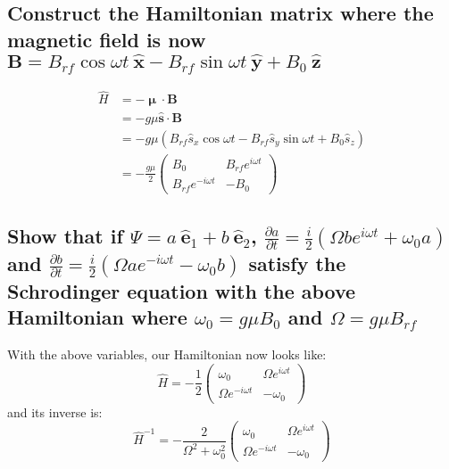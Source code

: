 \documentclass[a4paper]{scrartcl}
\begin{document}
\subsection{Construct the Hamiltonian matrix where the magnetic field is now \(\mathbf{B} = B_{rf} \cos \omega t \:\hat{\mathbf{x}} - B_{rf} \sin \omega t \:\hat{\mathbf{y}} + B_0 \:\hat{\mathbf{z}}\)}
\begin{align*}
    \hat{H} &= -\boldsymbol{\upmu} \cdot \mathbf{B} \\
    &= -g \mu \hat{\mathbf{s}} \cdot \mathbf{B} \\
    &= -g \mu (B_{rf} \hat{s}_x \cos \omega t - B_{rf} \hat{s}_y \sin \omega t + B_0 \hat{s}_z) \\
    &= -\frac{g \mu}{2} \begin{pmatrix}
        B_0 & B_{rf} e^{i \omega t} \\
        B_{rf} e^{-i \omega t} & -B_0
    \end{pmatrix}
\end{align*}

\subsection{Show that if \(\Psi = a \:\hat{\mathbf{e}}_1 + b \:\hat{\mathbf{e}}_2\), \(\frac{\partial a}{\partial t} = \frac{i}{2} \left(\Omega b e^{i \omega t} + \omega_0 a\right)\) and \(\frac{\partial b}{\partial t} = \frac{i}{2} \left(\Omega a e^{-i \omega t} - \omega_0 b\right)\) satisfy the Schrodinger equation with the above Hamiltonian where \(\omega_0 = g \mu B_0\) and \(\Omega = g \mu B_{rf}\)}
With the above variables, our Hamiltonian now looks like:
\[\hat{H} = -\frac{1}{2} \begin{pmatrix}
    \omega_0 & \Omega e^{i \omega t} \\
    \Omega e^{-i \omega t} & -\omega_0
\end{pmatrix}\]
and its inverse is:
\[\hat{H}^{-1} = -\frac{2}{\Omega^2 + \omega_0^2} \begin{pmatrix}
    \omega_0 & \Omega e^{i \omega t} \\
    \Omega e^{-i \omega t} & -\omega_0
\end{pmatrix}\]
\end{document}
